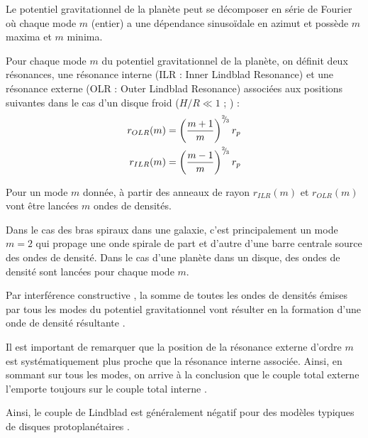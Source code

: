 
Le potentiel gravitationnel de la planète peut se décomposer en série de Fourier où chaque mode $m$ (entier) a une dépendance sinusoïdale en azimut et possède $m$ maxima et $m$ minima. 

Pour chaque mode $m$ du potentiel gravitationnel de la planète, on définit deux résonances, une résonance interne (ILR : Inner Lindblad Resonance) et une résonance externe (OLR : Outer Lindblad Resonance) associées aux positions suivantes dans le cas d'un disque froid ($H/R\ll 1$ ; \cite{ward1997protoplanet}) : 
\begin{subequations}
\begin{align}
r_{OLR}(m) &= \left(\frac{m+1}{m}\right)^{{}^{2\!\!}/ _{\!3}}r_p\\
r_{ILR}(m) &= \left(\frac{m-1}{m}\right)^{{}^{2\!\!}/ _{\!3}}r_p
\end{align}
\end{subequations}

Pour un mode $m$ donnée, à partir des anneaux de rayon $r_{ILR}(m)$ et $r_{OLR}(m)$ vont être lancées $m$ ondes de densités. 

Dans le cas des bras spiraux dans une galaxie, c'est principalement un mode $m=2$ qui propage une onde spirale de part et d'autre d'une barre centrale source des ondes de densité. Dans le cas d'une planète dans un disque, des ondes de densité sont lancées pour chaque mode $m$. 

Par interférence constructive \citep{ogilvie2002wake}, la somme de toutes les ondes de densités émises par tous les modes du potentiel gravitationnel vont résulter en la formation d'une onde de densité résultante . 

\bigskip

Il est important de remarquer que la position de la résonance externe d'ordre $m$ est systématiquement plus proche que la résonance interne associée. Ainsi, en sommant sur tous les modes, on arrive à la conclusion que le couple total externe l'emporte toujours sur le couple total interne \citep{ward1997protoplanet}. 

Ainsi, le couple de Lindblad est généralement négatif pour des modèles typiques de disques protoplanétaires \citep{ward1997protoplanet}.

